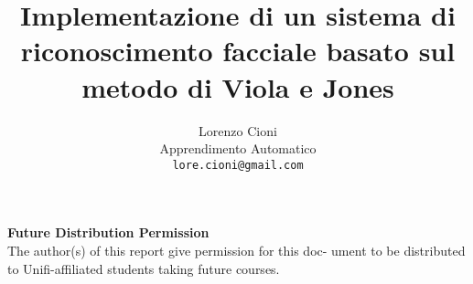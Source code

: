 \documentclass[10pt,twocolumn,letterpaper]{article}
\begin{document}
\title{Implementazione di un sistema di riconoscimento facciale basato sul metodo di Viola e Jones}

\author{Lorenzo Cioni\\
Apprendimento Automatico\\
{\tt\small lore.cioni@gmail.com}}

\maketitle
\thispagestyle{empty}



\noindent\large\textbf{Future Distribution Permission}\\
\indent The author(s) of this report give permission for this doc- ument to be distributed to Unifi-affiliated students taking future courses.











{\small


}
\end{document}
